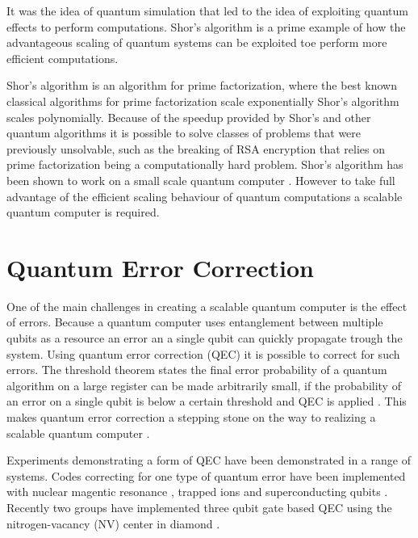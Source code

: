 It was the idea of quantum simulation that led to the idea of exploiting quantum effects to perform computations.
Shor's algorithm \citep{Shor1994Algorithms} is a prime example of how the advantageous scaling of quantum systems can be exploited toe perform more efficient computations.

Shor's algorithm is an algorithm for prime factorization, where the best known classical algorithms for prime factorization scale exponentially Shor's algorithm scales polynomially.
Because of  the speedup provided by Shor's and other quantum algorithms it is possible to solve classes of problems that were previously unsolvable, such as the breaking of RSA encryption that relies on prime factorization being a computationally hard problem.
Shor's algorithm has been shown to work on a small scale quantum computer \cite{Vandersypen2001Experimental}.
However to take full advantage of the efficient scaling behaviour of quantum computations a scalable quantum computer is required.

\section{Quantum Error Correction}
One of the main challenges in creating a scalable quantum computer is the effect of errors.
Because a quantum computer uses entanglement between multiple qubits as a resource an error an a single qubit can quickly propagate trough the system.
Using quantum error correction (QEC) it is possible to correct for such errors.
The threshold theorem states the final error probability of a quantum algorithm on a large register can be made arbitrarily small, if the probability of an error on a single qubit is below a certain threshold and QEC is applied \citep{Mermin1990Extreme}.
This makes quantum error correction a stepping stone on the way to realizing a scalable quantum computer \citep{Nielsen2010Quantum}.

Experiments demonstrating a form of QEC have been demonstrated in a range of systems.
Codes correcting for one type of quantum error have been implemented with nuclear magentic resonance \citep{Cory1998Experimental,Moussa2011Demonstration}, trapped ions \citep{Schindler2011Experimental}  and superconducting qubits \citep{Reed2012Realization}.
Recently two groups have implemented three qubit gate based QEC using the nitrogen-vacancy (NV) center in diamond \citep{Taminiau2014Universal,Waldherr2014Quantum}.

